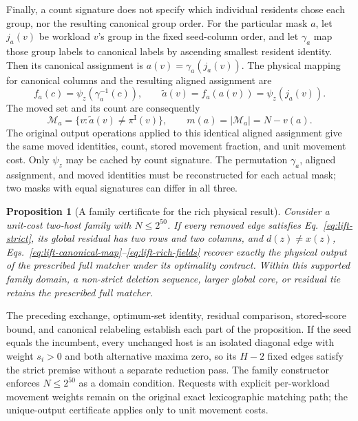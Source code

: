 \documentclass[11pt]{article}
\newtheorem{proposition}{Proposition}
\newcommand{\inc}{\pi^{\mathrm I}}
\begin{document}
Finally, a count signature does not specify which individual residents chose each group, nor the resulting canonical group order. For the particular mask $a$, let $j_a(v)$ be workload $v$'s group in the fixed seed-column order, and let $\gamma_a$ map those group labels to canonical labels by ascending smallest resident identity. Then its canonical assignment is $a(v)=\gamma_a(j_a(v))$. The physical mapping for canonical columns and the resulting aligned assignment are
\begin{equation}\label{eq:lift-canonical-map}
f_a(c)=\psi_z(\gamma_a^{-1}(c)),\qquad \widetilde a(v)=f_a(a(v))=\psi_z(j_a(v)).
\end{equation}
The moved set and its count are consequently
\begin{equation}\label{eq:lift-rich-fields}
\mathcal M_a=\{v:\widetilde a(v)\ne\inc(v)\},\qquad m(a)=|\mathcal M_a|=N-v(a).
\end{equation}
The original output operations applied to this identical aligned assignment give the same moved identities, count, stored movement fraction, and unit movement cost. Only $\psi_z$ may be cached by count signature. The permutation $\gamma_a$, aligned assignment, and moved identities must be reconstructed for each actual mask; two masks with equal signatures can differ in all three.

\begin{proposition}[A family certificate for the rich physical result]\label{prop:unique-physical-lift}
Consider a unit-cost two-host family with $N\le2^{50}$. If every removed edge satisfies Eq.~\eqref{eq:lift-strict}, its global residual has two rows and two columns, and $d(z)\ne x(z)$, Eqs.~\eqref{eq:lift-canonical-map}--\eqref{eq:lift-rich-fields} recover exactly the physical output of the prescribed full matcher under its optimality contract. Within this supported family domain, a non-strict deletion sequence, larger global core, or residual tie retains the prescribed full matcher.
\end{proposition}
The preceding exchange, optimum-set identity, residual comparison, stored-score bound, and canonical relabeling establish each part of the proposition. If the seed equals the incumbent, every unchanged host is an isolated diagonal edge with weight $s_i>0$ and both alternative maxima zero, so its $H-2$ fixed edges satisfy the strict premise without a separate reduction pass. The family constructor enforces $N\le2^{50}$ as a domain condition. Requests with explicit per-workload movement weights remain on the original exact lexicographic matching path; the unique-output certificate applies only to unit movement costs.
\end{document}
